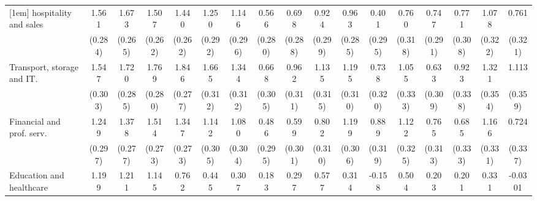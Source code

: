 {\begin{tabular}{l*{16}{c}}
[1em]
hospitality and sales&       1.561\sym{***}&       1.673\sym{***}&       1.507\sym{***}&       1.440\sym{***}&       1.250\sym{***}&       1.146\sym{***}&       0.566\sym{*}  &       0.698\sym{*}  &       0.924\sym{**} &       0.963\sym{***}&       0.401         &       0.760\sym{*}  &       0.747\sym{*}  &       0.771\sym{*}  &       1.078\sym{***}&       0.761\sym{*}  \\
                    &     (0.284)         &     (0.265)         &     (0.262)         &     (0.262)         &     (0.292)         &     (0.296)         &     (0.280)         &     (0.288)         &     (0.299)         &     (0.285)         &     (0.295)         &     (0.318)         &     (0.291)         &     (0.308)         &     (0.322)         &     (0.321)         \\
[1em]
Transport, storage and IT.&       1.547\sym{***}&       1.720\sym{***}&       1.769\sym{***}&       1.846\sym{***}&       1.665\sym{***}&       1.344\sym{***}&       0.668\sym{*}  &       0.962\sym{**} &       1.135\sym{***}&       1.195\sym{***}&       0.738\sym{*}  &       1.055\sym{**} &       0.633\sym{*}  &       0.923\sym{**} &       1.321\sym{***}&       1.113\sym{**} \\
                    &     (0.303)         &     (0.285)         &     (0.280)         &     (0.277)         &     (0.312)         &     (0.312)         &     (0.305)         &     (0.311)         &     (0.315)         &     (0.310)         &     (0.320)         &     (0.333)         &     (0.309)         &     (0.338)         &     (0.354)         &     (0.359)         \\
[1em]
Financial and prof. serv.&       1.249\sym{***}&       1.378\sym{***}&       1.514\sym{***}&       1.347\sym{***}&       1.142\sym{***}&       1.080\sym{***}&       0.486         &       0.599\sym{*}  &       0.802\sym{**} &       1.199\sym{***}&       0.889\sym{**} &       1.122\sym{***}&       0.765\sym{*}  &       0.685\sym{*}  &       1.166\sym{***}&       0.724\sym{*}  \\
                    &     (0.297)         &     (0.277)         &     (0.273)         &     (0.273)         &     (0.305)         &     (0.304)         &     (0.295)         &     (0.301)         &     (0.310)         &     (0.306)         &     (0.319)         &     (0.325)         &     (0.313)         &     (0.333)         &     (0.331)         &     (0.337)         \\
[1em]
Education and healthcare&       1.199\sym{***}&       1.211\sym{***}&       1.145\sym{***}&       0.762\sym{*}  &       0.445         &       0.307         &       0.183         &       0.297         &       0.577         &       0.314         &      -0.158         &       0.504         &       0.203         &       0.201         &       0.331         &     -0.0301         \\

\end{tabular}}
